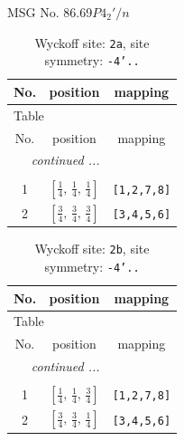 \documentclass[fleqn,8pt]{jsarticle}
\begin{document}
\setcounter{MaxMatrixCols}{32}

\renewcommand{\tablename}{Table~}
\renewcommand{\figurename}{Figure~}
\begin{center}
\LARGE
MSG No. 86.69\quad$P4_{2}'/n$
\end{center}
\renewcommand{\arraystretch}{1.2}
\begin{longtable}{ccc}
\caption{Wyckoff site: {\tt 2a}, site symmetry: {\tt -4'..}}
 \\
 \hline \hline
No. & position & mapping \\ \hline \endfirsthead

\multicolumn{2}{l}{\tablename\ \thetable{}} \\
 \hline \hline
No. & position & mapping \\ \hline \endhead

 \hline \hline
\multicolumn{2}{r}{\footnotesize\it continued ...} \\ \endfoot

 \hline \hline
\multicolumn{2}{r}{} \\ \endlastfoot

1 & $\left[ \frac{1}{4},\, \frac{1}{4},\, \frac{1}{4} \right]$ & {\tt [1,2,7,8]} \\ \hline
2 & $\left[ \frac{3}{4},\, \frac{3}{4},\, \frac{3}{4} \right]$ & {\tt [3,4,5,6]} \\
\end{longtable}
\renewcommand{\arraystretch}{1.2}
\begin{longtable}{ccc}
\caption{Wyckoff site: {\tt 2b}, site symmetry: {\tt -4'..}}
 \\
 \hline \hline
No. & position & mapping \\ \hline \endfirsthead

\multicolumn{2}{l}{\tablename\ \thetable{}} \\
 \hline \hline
No. & position & mapping \\ \hline \endhead

 \hline \hline
\multicolumn{2}{r}{\footnotesize\it continued ...} \\ \endfoot

 \hline \hline
\multicolumn{2}{r}{} \\ \endlastfoot

1 & $\left[ \frac{1}{4},\, \frac{1}{4},\, \frac{3}{4} \right]$ & {\tt [1,2,7,8]} \\ \hline
2 & $\left[ \frac{3}{4},\, \frac{3}{4},\, \frac{1}{4} \right]$ & {\tt [3,4,5,6]} \\
\end{longtable}
\end{document}
